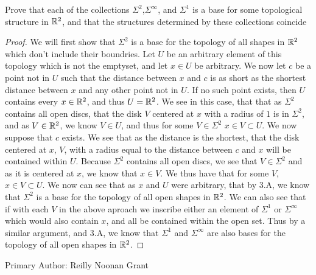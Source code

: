 \begin{minorEx}%
  Prove that each of the collections $\Sigma^2$,$\Sigma^\infty$, and
  $\Sigma^1$ is a base for some topological structure in $\mathbb{R}^2$, and
  that the structures determined by these collections coincide
\end{minorEx}
\begin{proof}
  We will first show that $\Sigma^2$ is a base for the topology of all
  shapes in $\mathbb{R}^2$ which don't include their boundries. Let $U$ be an
  arbitrary element of this topology which is not the emptyset, and
  let $x\in U$ be arbitrary. We now let $c$ be a point not in $U$ such
  that the distance between $x$ and $c$ is as short as the shortest
  distance between $x$ and any other point not in $U$. If no such
  point exists, then $U$ contains every $x\in\mathbb{R}^2$, and thus $U =
  \mathbb{R}^2$. We see in this case, that that as $\Sigma^2$ contains all open
  discs, that the disk $V$ centered at $x$ with a radius of $1$ is in
  $\Sigma^2$, and as $V\in \mathbb{R}^2$, we know $V \in U$, and thus for
  some $V\in \Sigma^2$  $x\in V \subset U$. We now suppose that $c$
  exists. We see that as the distance is the shortest, that the disk
  centered at $x$, $V$, with a radius equal to the distance between $c$ and
  $x$ will be contained within $U$. Because $\Sigma^2$ contains all open
  discs, we see that $V\in\Sigma^2$ and as it is centered at $x$, we
  know that $x \in V$. We thus have that for some $V$, $x\in V \subset
  U$. We now can see that as $x$ and $U$ were arbitrary, that by 3.A,
  we know that $\Sigma^2$ is a base for the topology of all open
  shapes in $\mathbb{R}^2$. We can also see that if with each $V$ in the
  above aproach we inscribe either an element of $\Sigma^1$ or
  $\Sigma^\infty$ which would also contain $x$, and all be contained
  within the open set. Thus by a similar argument, and 3.A, we know
  that $\Sigma^1$ and $\Sigma^\infty$ are also bases for the topology of all open
  shapes in $\mathbb{R}^2$.

\end{proof}

Primary Author: Reilly Noonan Grant